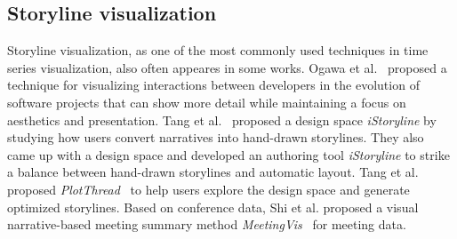 \documentclass[review,journal]{vgtc}         %
\begin{document}
\subsection{Storyline visualization} 
\noindent Storyline visualization, as one of the most commonly used techniques in time series visualization, also often appeares in some works. Ogawa et al.~\cite{ogawa_software_2010} proposed a technique for visualizing interactions between developers in the evolution of software projects that can show more detail while maintaining a focus on aesthetics and presentation. Tang et al.~\cite{tang_istoryline_2018} proposed a design space \textit{iStoryline} by studying how users convert narratives into hand-drawn storylines.
They also came up with a design space and developed an authoring tool \textit{iStoryline} to strike a balance between hand-drawn storylines and automatic layout.
Tang et al. proposed \textit{PlotThread}~\cite{tang_plotthread_2020} to help users explore the design space and generate optimized storylines.
Based on conference data, Shi et al. proposed a visual narrative-based meeting summary method \textit{MeetingVis}~\cite{shi_meetingvis_2018} for meeting data.
\end{document}
